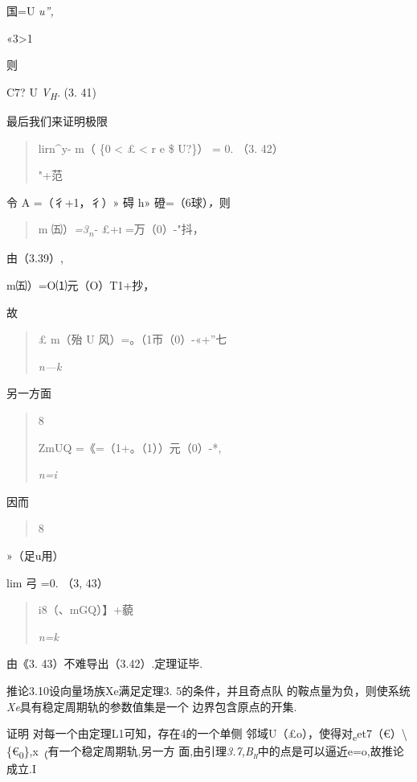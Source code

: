 \documentclass{article}
\begin{document}
国=U \emph{u'',}

«3\textgreater{}1

则

C7? U \emph{V\textsubscript{H}.} (3. 41)

最后我们来证明极限

\begin{quote}
lirn\^{}y- m（ \{0 \textless{} £ \textless{} r \textbar{}e \$ U?\}） =
0. （3. 42）

"+范
\end{quote}

令 A =（彳+1，彳）» 碍 h» 磴=（6球）\emph{，}则

\begin{quote}
m ㈤）\emph{=3\textsubscript{n}-} \textsc{£+i} =万（0）-"抖，
\end{quote}

由（3.39）,

m㈤）=O⑴元（O）T1+抄，

故

\begin{quote}
£ m（殆 U 风）=。（1帀（0）-«+''七

\emph{n---k}
\end{quote}

另一方面

\begin{quote}
8

ZmUQ =《=（1+。（1））元（0）-*,

\emph{n=i}
\end{quote}

因而

\begin{quote}
8
\end{quote}

»（足u用）

lim 弓 =0. （3, 43）

\begin{quote}
i8（、mGQ）】+藐

\emph{n=k}
\end{quote}

由《3. 43）不难导出（3.42）.定理证毕.\textbar{}

推论3.10设向量场族Xe满足定理3. 5的条件，并且奇点队
的鞍点量为负，则使系统\emph{Xe}具有稳定周期轨的参数值集是一个
边界包含原点的开集.

证明 对每一个由定理L1可知，存在4的一个单侧
邻域U（£o），使得对\textsubscript{e}et7（€）\textbackslash{}\{€\textsubscript{0}\},x\textsubscript{（}有一个稳定周期轨,另一方
面,由引理\emph{\textsc{3.7,B\textsubscript{h}}}中的点是可以逼近e=o,故推论成立.I
\end{document}
